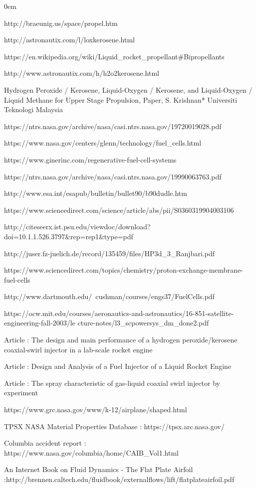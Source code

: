 \documentclass[a4paper,12pt,calibri,oneside,openany]{book}
\theoremstyle{break}
\begin{document}
\begin{enumerate}
	\itemsep0em 
	\footnotesize{
	\item http://braeunig.us/space/propel.htm
	\item http://astronautix.com/l/loxkerosene.html
	\item https://en.wikipedia.org/wiki/Liquid\_rocket\_propellant\#Bipropellants
	\item http://www.astronautix.com/h/h2o2kerosene.html
	\item Hydrogen Peroxide / Kerosene, Liquid-Oxygen / Kerosene, and Liquid-Oxygen / Liquid
	Methane for Upper Stage Propulsion, Paper, S. Krishnan* Universiti Teknologi Malaysia
	\item https://ntrs.nasa.gov/archive/nasa/casi.ntrs.nasa.gov/19720019028.pdf
	\item https://www.nasa.gov/centers/glenn/technology/fuel\_cells.html
	\item https://www.ginerinc.com/regenerative-fuel-cell-systems
	\item https://ntrs.nasa.gov/archive/nasa/casi.ntrs.nasa.gov/19990063763.pdf
	\item http://www.esa.int/esapub/bulletin/bullet90/b90dudle.htm
	\item https://www.sciencedirect.com/science/article/abs/pii/S0360319904003106
	\item http://citeseerx.ist.psu.edu/viewdoc/download?doi=10.1.1.526.3797\&rep=rep1\&type=pdf
	\item http://juser.fz-juelich.de/record/135459/files/HP3d\_3\_Ranjbari.pdf
	\item https://www.sciencedirect.com/topics/chemistry/proton-exchange-membrane-fuel-cells
	\item http://www.dartmouth.edu/~cushman/courses/engs37/FuelCells.pdf
	\item https://ocw.mit.edu/courses/aeronautics-and-astronautics/16-851-satellite-engineering-fall-2003/le
	cture-notes/l3\_scpowersys\_dm\_done2.pdf
	\item Article : The design and main performance of a hydrogen peroxide/kerosene coaxial-swirl injector in a lab-scale rocket engine
	\item Article : Design and Analysis of a Fuel Injector of a Liquid
	Rocket Engine
	\item Article : The spray characteristic of gas-liquid coaxial swirl injector by experiment
	\item https://www.grc.nasa.gov/www/k-12/airplane/shaped.html
	\item TPSX NASA Material Properties Database : https://tpsx.arc.nasa.gov/ 
	\item Columbia accident report : https://www.nasa.gov/columbia/home/CAIB\_Vol1.html
	\item  An Internet Book on Fluid Dynamics - The Flat Plate Airfoil :http://brennen.caltech.edu/fluidbook/externalflows/lift/flatplateairfoil.pdf
	
	
}
\end{enumerate}
\end{document}

